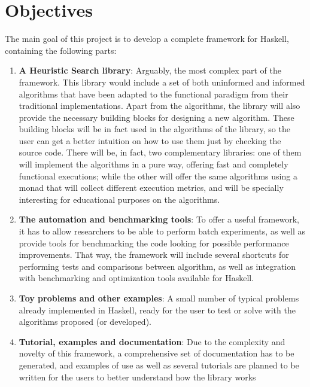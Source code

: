 \section{Objectives}

The main goal of this project is to develop a complete framework for Haskell,
containing the following parts:

\begin{enumerate}
\item \textbf{A Heuristic Search library}: Arguably, the most complex part of
  the framework. This library would include a set of both uninformed and
  informed algorithms that have been adapted to the functional paradigm from
  their traditional implementations. Apart from the algorithms, the library
  will also provide the necessary building blocks for designing a new
  algorithm. These building blocks will be in fact used in the algorithms of
  the library, so the user can get a better intuition on how to use them just
  by checking the source code. There will be, in fact, two complementary
  libraries: one of them will implement the algorithms in a pure way, offering
  fast and completely functional executions; while the other will offer the
  same algorithms using a monad that will collect different execution metrics,
  and will be specially interesting for educational purposes on the algorithms.
\item \textbf{The automation and benchmarking tools}: To offer a useful
  framework, it has to allow researchers to be able to perform batch
  experiments, as well as provide tools for benchmarking the code looking for
  possible performance improvements. That way, the framework will include
  several shortcuts for performing tests and comparisons between algorithm, as
  well as integration with benchmarking and optimization tools available for
  Haskell.
\item \textbf{Toy problems and other examples}: A small number of typical
  problems already implemented in Haskell, ready for the user to test or solve
  with the algorithms proposed (or developed).
\item \textbf{Tutorial, examples and documentation}: Due to the complexity and
  novelty of this framework, a comprehensive set of documentation has to be
  generated, and examples of use as well as several tutorials are planned to be
  written for the users to better understand how the library works
\end{enumerate}

\newpage